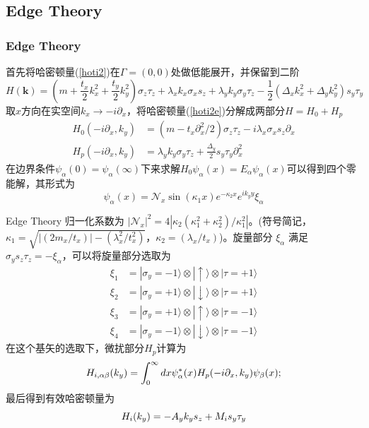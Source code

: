 \documentclass[10pt,aspectratio=169]{beamer} %
\begin{document}
\subsection{Edge Theory}
\begin{frame}
\frametitle{Edge Theory}
首先将哈密顿量(\ref{hoti2})在$\Gamma=(0,0)$处做低能展开，并保留到二阶
\begin{equation}
H(\mathbf{k})=(m+\frac{t_x}{2}k_x^2+\frac{t_y}{2}k_y^2)\sigma_z\tau_z+\lambda_xk_x\sigma_xs_z+\lambda_yk_y\sigma_y\tau_z-\frac{1}{2}(\Delta_xk_x^2+\Delta_yk_y^2)s_y\tau_y\label{hoti2e}
\end{equation}
取$x$方向在实空间$k_x\rightarrow-i\partial_x$，将哈密顿量(\ref{hoti2e})分解成两部分$H=H_0+H_p$
\begin{equation}
\begin{aligned}
H_0(-i\partial_x,k_y)&=(m-t_x\partial_x^2/2)\sigma_z\tau_z-i\lambda_x\sigma_xs_z\partial_x\\
H_p(-i\partial_x,k_y)&=\lambda_yk_y\sigma_y\tau_z+\frac{\Delta_y}{2}s_y\tau_y\partial_x^2
\end{aligned}
\end{equation}
在边界条件$\psi_\alpha(0)=\psi_\alpha(\infty)$下来求解$H_0\psi_\alpha(x)=E_\alpha\psi_\alpha(x)$可以得到四个零能解，其形式为
\begin{equation}
\psi_\alpha(x)=\mathcal{N}_x\sin(\kappa_1x)e^{-\kappa_2x}e^{ik_yy}\xi_\alpha
\end{equation}
\end{frame}
\begin{frame}{Edge Theory}
归一化系数为 $|\mathcal{N}_x|^2=4|\kappa_2(\kappa_1^2+\kappa_2^2)/\kappa_1^2|$。(符号简记，$\kappa_1=\sqrt{|(2m_x/t_x)|-(\lambda_x^2/t_x^2)}$，$ \kappa_2=(\lambda_x/t_x)$)。旋量部分 $\xi_\alpha$ 满足 $\sigma_ys_z\tau_z=-\xi_\alpha$，可以将旋量部分选取为
\begin{equation}
\begin{aligned}
\xi_1&=|\sigma_y=-1\rangle\otimes|\uparrow\rangle\otimes|\tau=+1\rangle\\
\xi_2&=|\sigma_y=+1\rangle\otimes|\downarrow\rangle\otimes|\tau=+1\rangle\\
\xi_3&=|\sigma_y=+1\rangle\otimes|\uparrow\rangle\otimes|\tau=-1\rangle\\
\xi_4&=|\sigma_y=-1\rangle\otimes|\downarrow\rangle\otimes|\tau=-1\rangle
\end{aligned}
\end{equation}
在这个基矢的选取下，微扰部分$H_p$计算为
\begin{equation}
H_{\uppercase\expandafter{\romannumeral1},\alpha\beta}(k_y)=\int_{0}^{\infty}dx\psi^*_\alpha(x)H_p(-i\partial_x,k_y)\psi_\beta(x);
\end{equation}
最后得到有效哈密顿量为
\begin{equation}
H_{\uppercase\expandafter{\romannumeral1}}(k_y)=-A_yk_ys_z+M_{\uppercase\expandafter{\romannumeral1}}s_y\tau_y
\end{equation}	
\end{frame}
\end{document}
